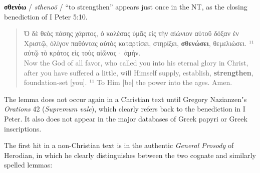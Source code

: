 \noindent{}\textbf{σθενόω} / \textit{sthenoō} / “to strengthen” %
appears just once in the NT, as the closing benediction of I Peter 5:10. %

\vspace*{2mm} 
 \begin{quote} Ὁ δὲ θεὸς πάσης χάριτος, ὁ καλέσας ὑμᾶς %
 εἰς τὴν αἰώνιον αὐτοῦ δόξαν ἐν Χριστῷ, %
 ὀλίγον παθόντας αὐτὸς καταρτίσει, στηρίξει, \textbf{σθενώσει}, θεμελιώσει.
 ¹¹ αὐτῷ τὸ κράτος εἰς τοὺς αἰῶνας· ἀμήν. \\[1mm] %
 Now the God of all favor, who called you into his eternal glory in Christ, %
 after you have suffered a little, %
 will Himself supply, establish, \textbf{strengthen}, foundation-set [you]. %
 ¹¹ To Him [be] the power into the ages. Amen. \end{quote} %
 \vspace*{2mm}

\noindent{}The lemma does not occur again in a Christian text until Gregory Nazianzenʼs %
 \textit{Orations} 42 (\textit{Supremum vale}), %
 which clearly refers back to the benediction in I Peter. %
 It also does not appear in the major databases of Greek papyri or Greek inscriptions.

The first hit in a non-Christian text is in the authentic \textit{General Prosody} of Herodian, %
in which he clearly distinguishes between the two cognate and similarly spelled lemmas: \clearpage
 
